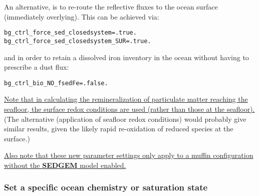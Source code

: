 An alternative, is to re-route the reflective fluxes to the ocean surface (immediately overlying). This can be achieved via:
\vspace{-1mm}\small\begin{verbatim}
bg_ctrl_force_sed_closedsystem=.true.
bg_ctrl_force_sed_closedsystem_SUR=.true.
\end{verbatim}\normalsize\vspace{-1mm}
and in order to retain a dissolved iron inventory in the ocean without having to prescribe a dust flux:
\vspace{-5mm}\small\begin{verbatim}
bg_ctrl_bio_NO_fsedFe=.false.
\end{verbatim}\normalsize\vspace{-1mm}
\uline{Note that in calculating the remineralization of particulate matter reaching the seafloor, the surface redox conditions are used (rather than those at the seafloor).} (The alternative (application of seafloor redox conditions) would probably give similar results, given the likely rapid re-oxidation of reduced species at the surface.)

\noindent \uline{Also note that these new parameter settings only apply to a muffin configuration without the \textbf{SEDGEM} model enabled.}

%
\newpage
\subsubsection{Set a specific ocean chemistry or saturation state}\label{set_saturation}
\vspace{1mm}

